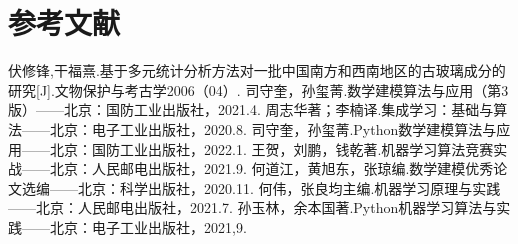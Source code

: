 \section{参考文献}


\renewcommand{\refname}{}
\vspace{-3em}  


\begin{thebibliography}{200}  
	伏修锋,干福熹.基于多元统计分析方法对一批中国南方和西南地区的古玻璃成分的研究[J].文物保护与考古学2006（04）.
	司守奎，孙玺菁.数学建模算法与应用（第3版）——北京：国防工业出版社，2021.4.
	周志华著；李楠译.集成学习：基础与算法——北京：电子工业出版社，2020.8. 
	司守奎，孙玺菁.Python数学建模算法与应用——北京：国防工业出版社，2022.1.
	王贺，刘鹏，钱乾著.机器学习算法竞赛实战——北京：人民邮电出版社，2021.9.
	何道江，黄旭东，张琼编.数学建模优秀论文选编——北京：科学出版社，2020.11.
	何伟，张良均主编.机器学习原理与实践——北京：人民邮电出版社，2021.7.
	孙玉林，余本国著.Python机器学习算法与实践——北京：电子工业出版社，2021,9.
\end{thebibliography} 